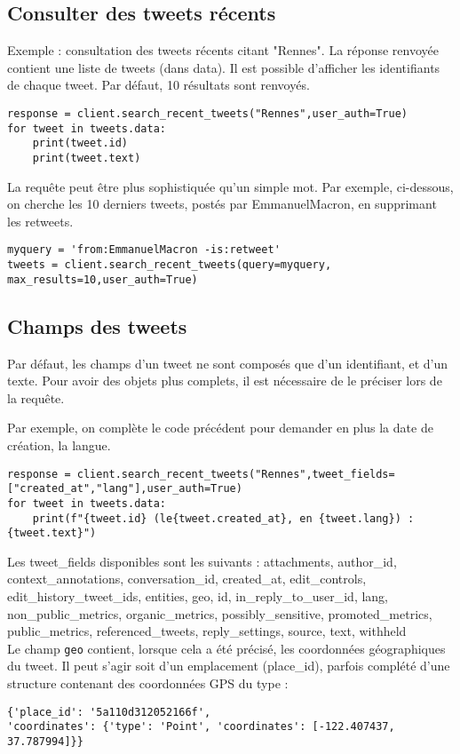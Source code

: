 \documentclass[11pt,a4paper]{article}
\begin{document}
\subsection{Consulter des tweets récents}
Exemple : consultation des tweets récents citant "Rennes". La réponse renvoyée contient une liste de tweets (dans data). Il est possible d'afficher les identifiants de chaque tweet. Par défaut, 10 résultats sont renvoyés. 
\begin{lstlisting}
response = client.search_recent_tweets("Rennes",user_auth=True)
for tweet in tweets.data:
    print(tweet.id)
    print(tweet.text)
\end{lstlisting}  

La requête peut être plus sophistiquée qu'un simple mot. 
Par exemple, ci-dessous, on cherche les 10 derniers tweets, postés par EmmanuelMacron, en supprimant les retweets.
\begin{lstlisting}
myquery = 'from:EmmanuelMacron -is:retweet'
tweets = client.search_recent_tweets(query=myquery, max_results=10,user_auth=True)
\end{lstlisting}                                    
\subsection{Champs des tweets}

Par défaut, les champs d'un tweet ne sont composés que d'un identifiant, et d'un texte. Pour avoir des objets plus complets, il est nécessaire de le préciser lors de la requête. 

Par exemple, on complète le code précédent pour demander en plus la date de création, la langue.
\begin{lstlisting}
response = client.search_recent_tweets("Rennes",tweet_fields=["created_at","lang"],user_auth=True)
for tweet in tweets.data:
    print(f"{tweet.id} (le{tweet.created_at}, en {tweet.lang}) : {tweet.text}") 
\end{lstlisting} 

Les tweet\_fields disponibles sont les suivants : 
attachments, author\_id, context\_annotations, conversation\_id, created\_at, edit\_controls, edit\_history\_tweet\_ids, entities, geo, id, in\_reply\_to\_user\_id, lang, non\_public\_metrics, organic\_metrics, possibly\_sensitive, promoted\_metrics, public\_metrics, referenced\_tweets, reply\_settings, source, text, withheld
\\

Le champ \verb+geo+ contient, lorsque cela a été précisé, les coordonnées géographiques du tweet. 
Il peut s'agir soit d'un emplacement (place\_id), parfois complété d'une structure contenant des coordonnées GPS du type : 
\begin{verbatim}
{'place_id': '5a110d312052166f', 
'coordinates': {'type': 'Point', 'coordinates': [-122.407437, 37.787994]}}
\end{verbatim}
\\
\end{document}
